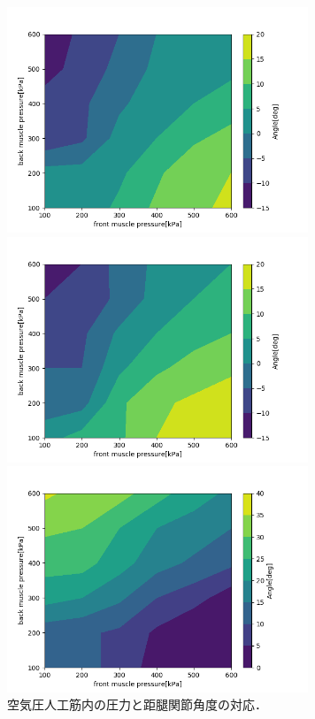  \begin{figure}
  \begin{minipage}[b]{.5\linewidth}
   \centering
   \includegraphics[clip,width = 9cm]{./fig/l_ankle_5deg.png}
  \end{minipage}
  \begin{minipage}[b]{.5\linewidth}
   \centering
   \includegraphics[clip,width = 9cm]{./fig/r_ankle_5deg.png}
  \end{minipage}
  \caption{空気圧人工筋内の圧力と距腿関節角度の対応．\label{ankle}}
  \begin{minipage}[b]{.5\linewidth}
   \centering
   \includegraphics[clip,width = 9cm]{./fig/l_knee_5deg.png}

\end{minipage}
\end{figure}

